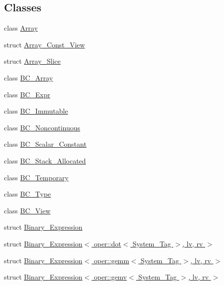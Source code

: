 \subsection*{Classes}
\begin{DoxyCompactItemize}
\item 
class \hyperlink{classBC_1_1tensors_1_1exprs_1_1Array}{Array}
\item 
struct \hyperlink{structBC_1_1tensors_1_1exprs_1_1Array__Const__View}{Array\+\_\+\+Const\+\_\+\+View}
\item 
struct \hyperlink{classBC_1_1tensors_1_1exprs_1_1Array__Slice}{Array\+\_\+\+Slice}
\item 
class \hyperlink{classBC_1_1tensors_1_1exprs_1_1BC__Array}{B\+C\+\_\+\+Array}
\item 
class \hyperlink{classBC_1_1tensors_1_1exprs_1_1BC__Expr}{B\+C\+\_\+\+Expr}
\item 
class \hyperlink{classBC_1_1tensors_1_1exprs_1_1BC__Immutable}{B\+C\+\_\+\+Immutable}
\item 
class \hyperlink{classBC_1_1tensors_1_1exprs_1_1BC__Noncontinuous}{B\+C\+\_\+\+Noncontinuous}
\item 
class \hyperlink{classBC_1_1tensors_1_1exprs_1_1BC__Scalar__Constant}{B\+C\+\_\+\+Scalar\+\_\+\+Constant}
\item 
class \hyperlink{classBC_1_1tensors_1_1exprs_1_1BC__Stack__Allocated}{B\+C\+\_\+\+Stack\+\_\+\+Allocated}
\item 
class \hyperlink{classBC_1_1tensors_1_1exprs_1_1BC__Temporary}{B\+C\+\_\+\+Temporary}
\item 
class \hyperlink{classBC_1_1tensors_1_1exprs_1_1BC__Type}{B\+C\+\_\+\+Type}
\item 
class \hyperlink{classBC_1_1tensors_1_1exprs_1_1BC__View}{B\+C\+\_\+\+View}
\item 
struct \hyperlink{structBC_1_1tensors_1_1exprs_1_1Binary__Expression}{Binary\+\_\+\+Expression}
\item 
struct \hyperlink{structBC_1_1tensors_1_1exprs_1_1Binary__Expression_3_01oper_1_1dot_3_01System__Tag_01_4_00_01lv_00_01rv_01_4}{Binary\+\_\+\+Expression$<$ oper\+::dot$<$ System\+\_\+\+Tag $>$, lv, rv $>$}
\item 
struct \hyperlink{structBC_1_1tensors_1_1exprs_1_1Binary__Expression_3_01oper_1_1gemm_3_01System__Tag_01_4_00_01lv_00_01rv_01_4}{Binary\+\_\+\+Expression$<$ oper\+::gemm$<$ System\+\_\+\+Tag $>$, lv, rv $>$}
\item 
struct \hyperlink{structBC_1_1tensors_1_1exprs_1_1Binary__Expression_3_01oper_1_1gemv_3_01System__Tag_01_4_00_01lv_00_01rv_01_4}{Binary\+\_\+\+Expression$<$ oper\+::gemv$<$ System\+\_\+\+Tag $>$, lv, rv $>$}

\end{DoxyCompactItemize}
